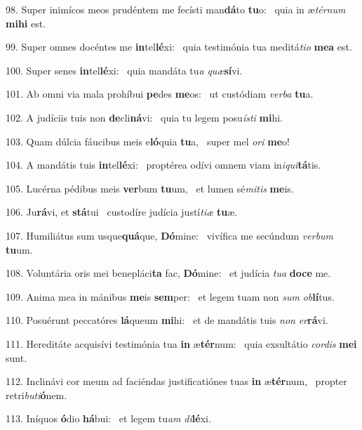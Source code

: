 98. Super inimícos meos prudéntem me fecísti man\textbf{dá}to \textbf{tu}o: \ast\  quia in æ\textit{tér}\textit{num} \textbf{mi}\textbf{hi} est.\

99. Super omnes docéntes me \textbf{in}tel\textbf{lé}xi: \ast\  quia testimónia tua meditá\textit{ti}\textit{o} \textbf{me}\textbf{a} est.\

100. Super senes \textbf{in}tel\textbf{lé}xi: \ast\  quia mandáta tu\textit{a} \textit{quæ}\textbf{sí}vi.\

101. Ab omni via mala prohíbui \textbf{pe}des \textbf{me}os: \ast\  ut custódiam \textit{ver}\textit{ba} \textbf{tu}a.\

102. A judíciis tuis non \textbf{de}cli\textbf{ná}vi: \ast\  quia tu legem posu\textit{ís}\textit{ti} \textbf{mi}hi.\

103. Quam dúlcia fáucibus meis e\textbf{ló}quia \textbf{tu}a, \ast\  super mel \textit{o}\textit{ri} \textbf{me}o!\

104. A mandátis tuis \textbf{in}tel\textbf{lé}xi: \ast\  proptérea odívi omnem viam in\textit{i}\textit{qui}\textbf{tá}tis.\

105. Lucérna pédibus meis \textbf{ver}bum \textbf{tu}um, \ast\  et lumen sé\textit{mi}\textit{tis} \textbf{me}is.\

106. Ju\textbf{rá}vi, et \textbf{stá}tui \ast\  custodíre judícia justí\textit{ti}\textit{æ} \textbf{tu}æ.\

107. Humiliátus sum usque\textbf{quá}que, \textbf{Dó}mine: \ast\  vivífica me secúndum \textit{ver}\textit{bum} \textbf{tu}um.\

108. Voluntária oris mei benepláci\textbf{ta} fac, \textbf{Dó}mine: \ast\  et judícia \textit{tu}\textit{a} \textbf{do}\textbf{ce} me.\

109. Anima mea in mánibus \textbf{me}is \textbf{sem}per: \ast\  et legem tuam non \textit{sum} \textit{ob}\textbf{lí}tus.\

110. Posuérunt peccatóres \textbf{lá}queum \textbf{mi}hi: \ast\  et de mandátis tuis \textit{non} \textit{er}\textbf{rá}vi.\

111. Hereditáte acquisívi testimónia tua \textbf{in} æ\textbf{tér}num: \ast\  quia exsultátio \textit{cor}\textit{dis} \textbf{me}\textbf{i} sunt.\

112. Inclinávi cor meum ad faciéndas justificatiónes tuas \textbf{in} æ\textbf{tér}num, \ast\  propter retri\textit{bu}\textit{ti}\textbf{ó}nem.\

113. Iníquos \textbf{ó}dio \textbf{há}bui: \ast\  et legem tu\textit{am} \textit{di}\textbf{lé}xi.\

